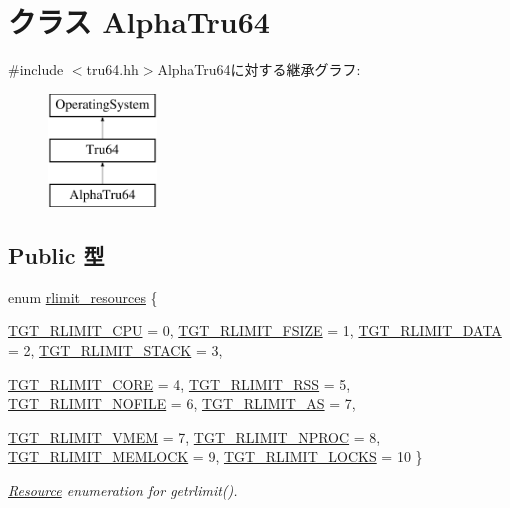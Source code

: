 \hypertarget{classAlphaTru64}{
\section{クラス AlphaTru64}
\label{classAlphaTru64}
}


{\ttfamily \#include $<$tru64.hh$>$}AlphaTru64に対する継承グラフ:\begin{figure}[H]
\begin{center}
\leavevmode
\includegraphics[height=3cm]{classAlphaTru64}
\end{center}
\end{figure}
\subsection*{Public 型}
\begin{DoxyCompactItemize}
\item 
enum \hyperlink{classAlphaTru64_a599454267926920de3bd5a488bda3e03}{rlimit\_\-resources} \{ \par
\hyperlink{classAlphaTru64_a599454267926920de3bd5a488bda3e03ad2d72256a0d172755a5984018f2afad8}{TGT\_\-RLIMIT\_\-CPU} =  0, 
\hyperlink{classAlphaTru64_a599454267926920de3bd5a488bda3e03ae0f07966ad956cd9e702fb01a4f3a9a1}{TGT\_\-RLIMIT\_\-FSIZE} =  1, 
\hyperlink{classAlphaTru64_a599454267926920de3bd5a488bda3e03abcf6a52c98bdfad0832696b231de99a2}{TGT\_\-RLIMIT\_\-DATA} =  2, 
\hyperlink{classAlphaTru64_a599454267926920de3bd5a488bda3e03a08e62a1dfe173892d7a251c73a8a3f6a}{TGT\_\-RLIMIT\_\-STACK} =  3, 
\par
\hyperlink{classAlphaTru64_a599454267926920de3bd5a488bda3e03a89e77f710c8de2c5d30f835b6f9ecff4}{TGT\_\-RLIMIT\_\-CORE} =  4, 
\hyperlink{classAlphaTru64_a599454267926920de3bd5a488bda3e03af8c89e70a7d4ff9e8854599d3a168529}{TGT\_\-RLIMIT\_\-RSS} =  5, 
\hyperlink{classAlphaTru64_a599454267926920de3bd5a488bda3e03af2a76cff253996593d8c22981696e110}{TGT\_\-RLIMIT\_\-NOFILE} =  6, 
\hyperlink{classAlphaTru64_a599454267926920de3bd5a488bda3e03a3f118b58936b90cf8382d441ef567c39}{TGT\_\-RLIMIT\_\-AS} =  7, 
\par
\hyperlink{classAlphaTru64_a599454267926920de3bd5a488bda3e03a3c2043afa66b0d70c66cbbbb6800b97f}{TGT\_\-RLIMIT\_\-VMEM} =  7, 
\hyperlink{classAlphaTru64_a599454267926920de3bd5a488bda3e03af653a805832a388dbc3548d5d06150cb}{TGT\_\-RLIMIT\_\-NPROC} =  8, 
\hyperlink{classAlphaTru64_a599454267926920de3bd5a488bda3e03a1c5dcb48959f77f93f7c104f76b4b88d}{TGT\_\-RLIMIT\_\-MEMLOCK} =  9, 
\hyperlink{classAlphaTru64_a599454267926920de3bd5a488bda3e03aabd123e8e2b5b10d6a26e053b938a3e6}{TGT\_\-RLIMIT\_\-LOCKS} =  10
 \}
\begin{DoxyCompactList}\small\item\em \hyperlink{classResource}{Resource} enumeration for getrlimit(). \item\end{DoxyCompactList}\end{DoxyCompactItemize}

